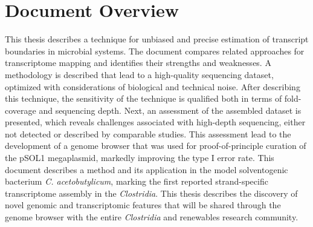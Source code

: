 \section{Document Overview}
This thesis describes a technique for unbiased and precise estimation of transcript boundaries in microbial systems. The document compares related approaches for transcriptome mapping and identifies their strengths and weaknesses. A methodology is described that lead to a high-quality sequencing dataset, optimized with considerations of biological and technical noise. After describing this technique, the sensitivity of the technique is qualified both in terms of fold-coverage and sequencing depth. Next, an assessment of the assembled dataset is presented, which reveals challenges associated with high-depth sequencing, either not detected or described by comparable studies. This assessment lead to the development of a genome browser that was used for proof-of-principle curation of the pSOL1 megaplasmid, markedly improving the type I error rate. This document describes a method and its application in the model solventogenic bacterium \textit{C. acetobutylicum}, marking the first reported strand-specific transcriptome assembly in the \textit{Clostridia}. This thesis describes the discovery of novel genomic and transcriptomic features that will be shared through the genome browser with the entire \textit{Clostridia} and renewables research community. 